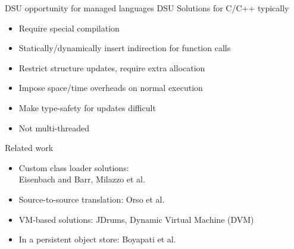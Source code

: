 \begin{frame}{DSU opportunity for managed languages}%
DSU Solutions for C/C++ typically
\begin{itemize}
\item Require special compilation
\item Statically/dynamically insert indirection for function calls
\item Restrict structure updates, require extra allocation
\item Impose space/time overheads on normal execution
\item Make type-safety for updates difficult
\item Not multi-threaded
\end{itemize}
\end{frame}


\begin{frame}{Related work}%
\begin{itemize}
\item Custom class loader solutions:\\Eisenbach and Barr, Milazzo et al.
\item Source-to-source translation: Orso et al.
\item VM-based solutions: JDrums, Dynamic Virtual Machine (DVM)
\item In a persistent object store: Boyapati et al.
\end{itemize}
\end{frame}

